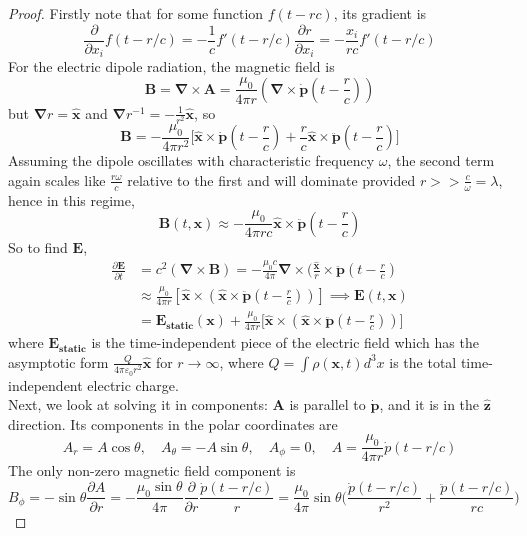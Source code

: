 \documentclass[a4paper]{article}
\theoremstyle{new}
\begin{document}
\begin{proof}
Firstly note that for some function $f(t-rc)$, its gradient is
$$\frac{\partial}{\partial x_i}f(t-r/c)=-\frac{1}{c}f'(t-r/c)\frac{\partial r}{\partial x_i}=-\frac{x_i}{rc}f'(t-r/c)$$
For the electric dipole radiation, the magnetic field is
$$\mathbf{B}=\boldsymbol{\nabla}\times\mathbf{A}=\frac{\mu_0}{4\pi r}(\boldsymbol{\nabla}\times\mathbf{\dot{p}}(t-\frac{r}{c}))$$
but $\boldsymbol{\nabla}r=\mathbf{\hat{x}}$ and $\boldsymbol{\nabla}r^{-1}=-\frac{1}{r^2}\mathbf{\hat{x}}$, so
$$\mathbf{B}=-\frac{\mu_0}{4\pi r^2}\bigg[\mathbf{\hat{x}}\times\mathbf{\dot{p}}(t-\frac{r}{c})+\frac{r}{c}\mathbf{\hat{x}}\times\mathbf{\ddot{p}}(t-\frac{r}{c})\bigg]$$
Assuming the dipole oscillates with characteristic frequency $\omega$, the second term again scales like $\frac{r\omega}{c}$ relative to the first and will dominate provided $r>>\frac{c}{\omega}=\lambda$, hence in this regime,
$$\mathbf{B}(t,\mathbf{x})\approx-\frac{\mu_0}{4\pi rc}\mathbf{\hat{x}}\times\mathbf{\ddot{p}}(t-\frac{r}{c})$$
So to find $\mathbf{E}$,
\begin{align}
\frac{\partial\mathbf{E}}{\partial t}&=c^2(\boldsymbol{\nabla}\times\mathbf{B})=-\frac{\mu_0 c}{4\pi}\boldsymbol{\nabla}\times(\frac{\mathbf{\hat{x}}}{r}\times\mathbf{\ddot{p}}(t-\frac{r}{c})\nonumber\\&\approx\frac{\mu_0}{4\pi r}[\mathbf{\hat{x}}\times(\mathbf{\hat{x}}\times\mathbf{\ddot{p}}(t-\frac{r}{c}))]\implies\mathbf{E}(t,\mathbf{x})\nonumber\\&=\mathbf{E_{static}}(\mathbf{x})+\frac{\mu_0}{4\pi r}\bigg[\mathbf{\hat{x}}\times(\mathbf{\hat{x}}\times\mathbf{\ddot{p}}(t-\frac{r}{c}))\bigg]\nonumber
\end{align}
where $\mathbf{E_{static}}$ is the time-independent piece of the electric field which has the asymptotic form $\frac{Q}{4\pi\varepsilon_0r^2}\mathbf{\hat{x}}$ for $r\rightarrow\infty$, where $Q=\int\rho(\mathbf{x},t)d^3x$ is the total time-independent electric charge.\\[5pt]
Next, we look at solving it in components: $\mathbf{A}$ is parallel to $\mathbf{\dot{p}}$, and it is in the $\mathbf{\hat{z}}$ direction. Its components in the polar coordinates are
$$A_r=A\cos\theta,\quad A_\theta=-A\sin\theta,\quad A_\phi=0,\quad A=\frac{\mu_0}{4\pi r}\dot{p}(t-r/c)$$
The only non-zero magnetic field component is
$$B_\phi=-\sin\theta\frac{\partial A}{\partial r}=-\frac{\mu_0\sin\theta}{4\pi}\frac{\partial}{\partial r}\frac{\dot{p}(t-r/c)}{r}=\frac{\mu_0}{4\pi}\sin\theta\bigg(\frac{\dot{p}(t-r/c)}{r^2}+\frac{\ddot{p}(t-r/c)}{rc}\bigg)$$

\end{proof}
\end{document}
